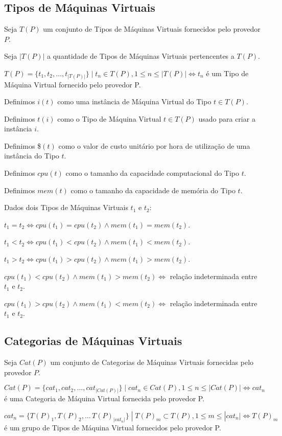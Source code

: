 \subsection{Tipos de Máquinas Virtuais}
Seja $T(P)$ um conjunto de Tipos de Máquinas Virtuais fornecidos pelo provedor $P$.

Seja $|T(P)|$ a quantidade de Tipos de Máquinas Virtuais pertencentes a $T(P)$.

$T(P) = \{t_1, t_2, \dotsc, t_{|T(P)|}\}\; | \; t_n \in T(P), 1 \leq n \leq |T(P)|
 \iff t_n $ é um Tipo de Máquina Virtual fornecido pelo provedor P.

Definimos $i(t)$ como uma instância de Máquina Virtual do Tipo $t \in T(P)$. 

Definimos $t(i)$ como o Tipo de Máquina Virtual $t \in T(P)$ usado para criar a 
instância $i$.

Definimos \$$(t)$ como o valor de custo unitário por hora de utilização de uma 
instância do Tipo $t$.

Definimos $cpu(t)$ como o tamanho da capacidade computacional do Tipo $t$.

Definimos $mem(t)$ como o tamanho da capacidade de memória do Tipo $t$.

Dados dois Tipos de Máquinas Virtuais $t_1$ e $t_2$:

$t_1 = t_2 \iff cpu(t_1) = cpu(t_2) \land mem(t_1) = mem(t_2)$.

$t_1 < t_2 \iff cpu(t_1) < cpu(t_2) \land mem(t_1) < mem(t_2)$.

$t_1 > t_2 \iff cpu(t_1) > cpu(t_2) \land mem(t_1) > mem(t_2)$.

$cpu(t_1) < cpu(t_2) \land mem(t_1) > mem(t_2) \iff$ relação indeterminada entre $t_1$ e $t_2$.

$cpu(t_1) > cpu(t_2) \land mem(t_1) < mem(t_2) \iff$ relação indeterminada entre $t_1$ e $t_2$.

\subsection{Categorias de Máquinas Virtuais}
Seja $Cat(P)$ um conjunto de Categorias de Máquinas Virtuais fornecidas pelo 
provedor $P$.

$Cat(P) = \{cat_1, cat_2, \dotsc, cat_{|Cat(P)|}\}\; | \; cat_n \in Cat(P), 
1 \leq n \leq |Cat(P)| \iff cat_n $ é uma Categoria de Máquina Virtual fornecida 
pelo provedor P.

$cat_n = \{T(P)_1, T(P)_2, \dotsc\, T(P)_{|cat_n|}\}\; | \; T(P)_m \subset T(P), 
1 \leq m \leq |cat_n| \iff T(P)_m $ é um grupo de Tipos de Máquina Virtual
fornecidos pelo provedor P.

